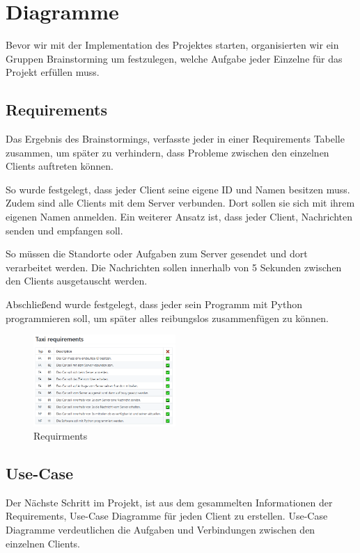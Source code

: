 \section{Diagramme}


Bevor wir mit der Implementation des Projektes starten, 
organisierten wir ein Gruppen Brainstorming um festzulegen, 
welche Aufgabe jeder Einzelne für das Projekt erfüllen muss. 

\subsection{Requirements}

Das Ergebnis des Brainstormings, verfasste jeder in einer Requirements Tabelle zusammen, um später zu verhindern, dass Probleme zwischen den einzelnen Clients auftreten können.

So wurde festgelegt, dass jeder Client seine eigene ID und Namen besitzen muss. 
Zudem sind alle Clients mit dem Server verbunden. 
Dort sollen sie sich mit ihrem eigenen Namen anmelden. Ein weiterer Ansatz ist, dass jeder Client, Nachrichten senden und empfangen soll. 

So müssen die Standorte oder Aufgaben zum Server gesendet und dort verarbeitet werden.
Die Nachrichten sollen innerhalb von 5 Sekunden zwischen den Clients ausgetauscht werden.

Abschließend wurde festgelegt, dass jeder sein Programm mit Python programmieren soll, um später alles reibungslos zusammenfügen zu können.


\begin{figure}[htbp] 
  \centering
     \includegraphics[width=0.48\textwidth]{Bsp_requirments.png}
     \caption{Requirments}
\end{figure}

\subsection{Use-Case}

Der Nächste Schritt im Projekt, ist aus dem gesammelten Informationen der Requirements, Use-Case Diagramme für jeden Client zu erstellen.
Use-Case Diagramme verdeutlichen die Aufgaben und Verbindungen zwischen den einzelnen Clients.

